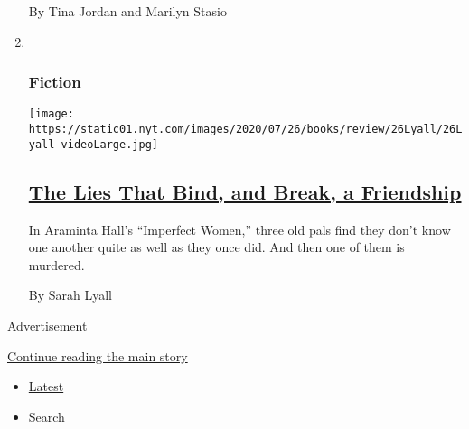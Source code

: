 \begin{enumerate}
  By Tina Jordan and Marilyn Stasio
\item ~
  \hypertarget{fiction-3}{%
  \subsubsection{Fiction}\label{fiction-3}}

  \texttt{[image: https://static01.nyt.com/images/2020/07/26/books/review/26Lyall/26Lyall-videoLarge.jpg]}

  \hypertarget{the-lies-that-bind-and-break-a-friendship}{%
  \subsection{\texorpdfstring{\href{/2020/07/24/books/review/araminta-hall-imperfect-women.html}{The
  Lies That Bind, and Break, a
  Friendship}}{The Lies That Bind, and Break, a Friendship}}\label{the-lies-that-bind-and-break-a-friendship}}

  In Araminta Hall's ``Imperfect Women,'' three old pals find they don't
  know one another quite as well as they once did. And then one of them
  is murdered.

  By Sarah Lyall
\end{enumerate}

Advertisement

\protect\hyperlink{after-mid1}{Continue reading the main story}

\begin{itemize}
\tightlist
\item
  \protect\hyperlink{stream-panel}{Latest}
\item
  Search
\end{itemize}

